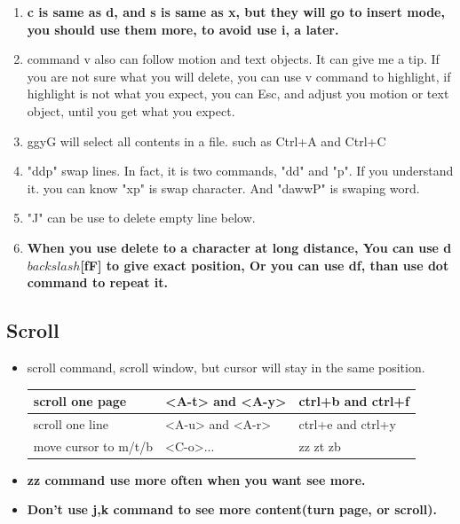 \documentclass[a4paper,12pt,twoside]{book}
\begin{document}
\begin{itemize}
\begin{enumerate}
				\item \textbf{c is same as d, and s is same as x, but they will go to insert mode, you should use them more, to avoid use i, a later.}  
				
				\item command v also can follow motion and text objects. It can give me a tip. If you are not sure what you will delete, you can use v command to highlight, if highlight is not what you expect, you can Esc, and adjust you motion or text object, until you get what you expect. 

				\item ggyG will select all contents in a file. such as Ctrl+A and Ctrl+C 

			\item "ddp" swap lines. In fact, it is two commands, "dd" and "p". If you understand it. you can know "xp" is swap character. And "dawwP" is swaping word.

			\item "J" can be use to delete empty line below.

			\item \textbf{When you use delete to a character at long distance, You can use d$backslash$[fF] to give exact position, Or you can use df, than use dot command to repeat it. }
	\end{enumerate}
\end{itemize}


\subsection{Scroll}
\begin{itemize}
\item scroll command, scroll window, but cursor will stay in the same position.
\begin{center}
 \begin{tabular}{p{}|p{}|p{}}
        \hline
        scroll one  page &  <A-t> and <A-y>  & ctrl+b and  ctrl+f    \\
        
        \hline 		  
        scroll one line &  <A-u> and <A-r>  & ctrl+e and ctrl+y \\
        
         \hline 		  
        move cursor to m/t/b & <C-o>...    & zz zt zb \\
		\hline
    \end{tabular}
\end{center}
\item \textbf{zz command use more often when you want see more.}
\item \textbf{Don't use j,k command to see more content(turn page, or scroll).}
\end{itemize} 
\end{document}
